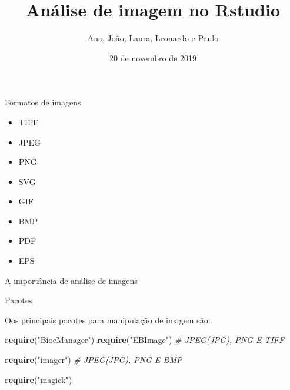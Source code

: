 \documentclass[
  ignorenonframetext,
]{beamer}
\title{Análise de imagem no Rstudio}
\author{Ana, João, Laura, Leonardo e Paulo}
\date{20 de novembro de 2019}
\newenvironment{Shaded}{\begin{snugshade}}{\end{snugshade}}
\newcommand{\CommentTok}[1]{\textcolor[rgb]{0.56,0.35,0.01}{\textit{#1}}}
\newcommand{\KeywordTok}[1]{\textcolor[rgb]{0.13,0.29,0.53}{\textbf{#1}}}
\newcommand{\NormalTok}[1]{#1}
\newcommand{\StringTok}[1]{\textcolor[rgb]{0.31,0.60,0.02}{#1}}
\begin{document}
\frame{\titlepage}

\begin{frame}{Formatos de imagens}
\protect\hypertarget{formatos-de-imagens}{}

\small

\begin{itemize}
    \item TIFF
    \item JPEG
    \item PNG
    \item SVG
    \item GIF
    \item BMP
    \item PDF
    \item EPS
\end{itemize}

\end{frame}

\begin{frame}{A importância de análise de imagens}
\protect\hypertarget{a-importuxe2ncia-de-anuxe1lise-de-imagens}{}

\small

\end{frame}

\begin{frame}[fragile]{Pacotes}
\protect\hypertarget{pacotes}{}

\small

Oos principais pacotes para manipulação de imagem são:

\begin{Shaded}
\begin{Highlighting}[]
\KeywordTok{require}\NormalTok{(}\StringTok{"BiocManager"}\NormalTok{) }
\KeywordTok{require}\NormalTok{(}\StringTok{"EBImage"}\NormalTok{) }\CommentTok{# JPEG(JPG), PNG E TIFF}

\KeywordTok{require}\NormalTok{(}\StringTok{"imager"}\NormalTok{) }\CommentTok{# JPEG(JPG), PNG E BMP}

\KeywordTok{require}\NormalTok{(}\StringTok{"magick"}\NormalTok{) }
\end{Highlighting}
\end{Shaded}

\end{frame}
\end{document}
